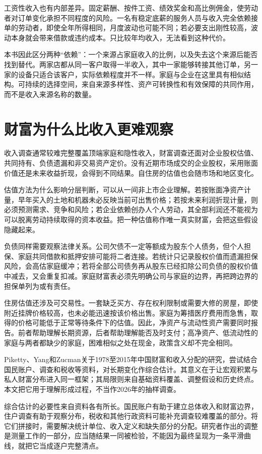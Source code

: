 \documentclass[UTF8,fontset=fandol,zihao=-4,oneside,openany]{ctexbook}
\begin{document}
工资性收入也有内部差异。固定薪酬、按件工资、绩效奖金和高比例佣金，使劳动者对订单变化承担不同程度的风险。一名有稳定底薪的服务人员与收入完全依赖接单的劳动者，即使全年所得相同，月度波动也可能不同；若必要支出刚性较高，波动本身就会带来借款或违约成本。只比较年均收入，无法看到这种代价。

本书因此区分两种“依赖”：一个来源占家庭收入的比例，以及失去这个来源后能否找到替代。两家店都从同一客户取得一半收入，其中一家能够转接其他订单，另一家的设备只适合该客户，实际依赖程度并不一样。家庭与企业在这里具有相似结构。可持续的选择空间，来自来源多样性、资产可转换性和有效保障的共同作用，而不是收入来源名称的数量。

\section{财富为什么比收入更难观察}
收入调查通常较难完整覆盖顶端家庭和隐性收入，财富调查还面对企业股权估值、共同持有、负债遗漏和非交易资产定价。没有近期市场成交的企业股权，采用账面价值还是未来收益折现，会得到不同结果。自住房的估值也会随市场和地区变化。

\label{arg:P162}
估值方法为什么影响分层判断，可以从一间非上市企业理解。若按账面净资产计量，早年买入的土地和机器未必反映当前可出售价格；若按未来利润折现计量，则必须预测需求、竞争和风险；若企业依赖创办人个人劳动，其全部利润还不能视为可以脱离劳动持续取得的资本收益。把一种估值称作唯一真实财富，会把这些假设隐藏起来。

负债同样需要观察法律关系。公司欠债不一定等额成为股东个人债务，但个人担保、家庭共同借款和抵押安排可能将二者连接。若统计只记录股权价值而遗漏担保风险，会高估家庭缓冲；若将全部公司债务再从股东已经扣除公司负债的股权价值中减去，又会重复扣减。家庭财富表必须先明确公司与家庭的边界，再把跨边界的担保单列为或有责任。

住房估值还涉及可交易性。一套缺乏买方、存在权利限制或需要大修的房屋，即使附近挂牌价格较高，也未必能迅速按该价格出售。家庭为筹措医疗费用而急售，取得的价格可能低于正常等待条件下的估值。因此，净资产与流动性资产需要同时报告。前者帮助理解长期资源，后者帮助理解能否及时支付；高净资产、低流动性的家庭与两者都缺少的家庭，困难相似之处在现金，政策含义却不完全相同。

Piketty、Yang和Zucman关于1978至2015年中国财富和收入分配的研究，尝试结合国民账户、调查和税收等资料，对长期变化作综合估计。其意义在于让宏观积累与私人财富分布进入同一框架；其局限则来自基础资料覆盖、调整假设和历史终点。本文把它用于理解形成过程，不当作2026年的抽样调查。\cite{PYZ2019}

\label{arg:P163}
综合估计的必要性来自资料各有所长。国民账户有助于建立总体收入和财富边界，住户调查有助于观察分布，税收和其他行政资料可能补充调查较难覆盖的部分。将它们拼接时，需要解决统计单位、收入定义和缺失部分的分配。研究者作出的调整是测量工作的一部分，应当随结果一同被检验，不能因为最终呈现为一条平滑曲线，就把它当成逐户完整清点。\cite{PYZ2019}
\end{document}
